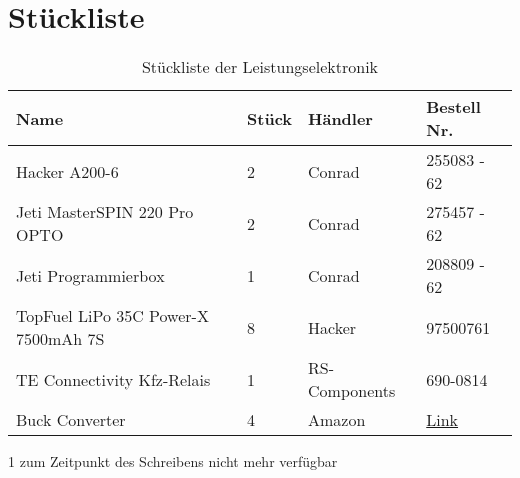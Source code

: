 \section{Stückliste}

\begin{table}[h]
    \begin{threeparttable}
    \centering
    \begin{tabular}{|l|l|l|l|}
        \hline
    Name                         & Stück & Händler & Bestell Nr. \\\hline
    Hacker A200-6                & 2      & Conrad  & 255083 - 62 \\
    Jeti MasterSPIN 220 Pro OPTO & 2      & Conrad  & 275457 - 62 \\
    Jeti Programmierbox          & 1      & Conrad  & 208809 - 62 \\
    TopFuel LiPo 35C Power-X 7500mAh 7S & 8 & Hacker & 97500761 \\
    TE Connectivity Kfz-Relais & 1 & RS-Components & 690-0814 \\
    Buck Converter & 4 & Amazon & \href{https://www.amazon.de/gp/product/B085DSMFQM/ref=ppx_yo_dt_b_asin_image_o03_s00?ie=UTF8&psc=1}{Link} \\\hline 
    \end{tabular}
    \begin{tablenotes}\footnotesize 
        \item[1] zum Zeitpunkt des Schreibens nicht mehr verfügbar 
    \end{tablenotes}
\end{threeparttable}
    \caption{Stückliste der Leistungselektronik}
\end{table}